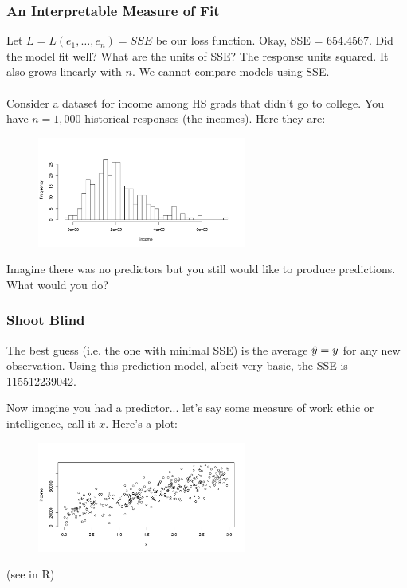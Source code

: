 \documentclass[slides]{beamer} %
\begin{document}
\begin{frame}\frametitle{An Interpretable Measure of Fit}

\small
Let $L = L(e_1, \ldots, e_n) = SSE$ be our loss function. Okay, SSE = 654.4567. Did the model fit well?   \pause What are the units of SSE?  \pause The response units squared.  \pause It also grows linearly with $n$. We cannot compare models using SSE.\\~\\

Consider a dataset for income among HS grads that didn't go to college. You have $n=1,000$ historical responses (the incomes). Here they are:

\vspace{-0.25cm}
\begin{figure}
\centering\includegraphics[width=2.7in]{incomes}
\end{figure}
 \pause 
	
\vspace{-0.25cm}
Imagine there was no predictors but you still would like to produce predictions. What would you do?
\end{frame}

\begin{frame}\frametitle{Shoot Blind}

The best guess (i.e. the one with minimal SSE) is the average $\hat{y} = \bar{y}$ for any new observation. Using this prediction model, albeit very basic, the SSE is 115512239042. \pause 

Now imagine you had a predictor... let's say some measure of work ethic or intelligence, call it $x$. Here's a plot:

\vspace{-0.25cm}
\begin{figure}
\centering\includegraphics[width=2.7in]{income_by_x}
\end{figure}
	
(see in R)


\end{frame}
\end{document}
